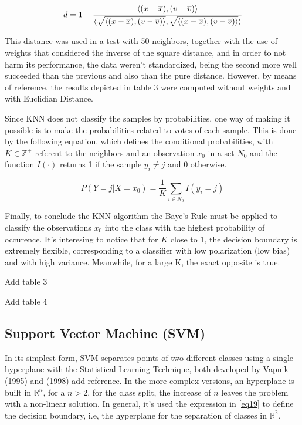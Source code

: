 \documentclass[conference]{IEEEtran}
\newcommand{\reviewUrgent}[1]{{\color{red} #1}} %
\begin{document}
\begin{equation}
    d = 1 - \cfrac{\langle (x-\overline{x}), (v - \overline{v})\rangle}{\langle \sqrt{\langle (x-\overline{x}), (v - \overline{v})\rangle}, \sqrt{\langle (x-\overline{x}), (v - \overline{v})\rangle}\rangle}
\end{equation}

This distance was used in a test with 50 neighbors, together with the use of weights that
considered the inverse of the square distance, and in order to not harm its performance, the data weren't standardized, being the second more well succeeded than
the previous and also than the pure distance. However, by means of reference, the results 
depicted in table 3 were computed without weights and with Euclidian Distance.

Since KNN does not classify the samples by probabilities, one way of making it possible is to 
make the probabilities related to votes of each sample. This is done by the following 
equation. which defines the conditional probabilities, with $K \in \mathbb{Z}^{+}$ referent 
to the neighbors and an observation $x_0$ in a set $N_0$ and the function $I(\cdot)$
returns 1 if the sample $y_i \neq j$ and 0 otherwise.

\begin{equation}
    P(Y = j|X = x_0) = \frac{1}{K} \sum_{i \in N_0} I(y_i = j) 
\end{equation}

Finally, to conclude the KNN algorithm the Baye's Rule must be applied to classify the 
observations $x_0$ into the class with the highest probability of occurence. It's 
interesing to notice that for $K$ close to 1, the decision boundary is extremely 
flexible, corresponding to a classifier with low polarization (low bias) and with 
high variance. Meanwhile, for a large K, the exact opposite is true.

\reviewUrgent{Add table 3} 

\reviewUrgent{Add table 4}


\subsection{Support Vector Machine (SVM)}

In its simplest form, SVM separates points of two different classes using a single
hyperplane with the Statistical Learning Technique, both developed by Vapnik (1995) and (1998) \reviewUrgent{add reference}.
In the more complex versions, an hyperplane is built in $\mathbb{R}^n$, for a $n>2$, for 
the class split, the increase of $n$ leaves the problem with a non-linear solution. In general,
it's used the expression in \eqref{eq19} to define the decision boundary, i.e, the hyperplane
for the separation of classes in $\mathbb{R}^2$.
\end{document}
